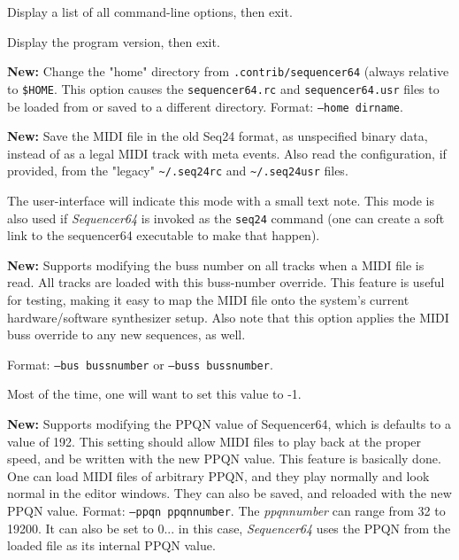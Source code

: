       Display a list of all command-line options, then exit.

      Display the program version, then exit.

      \textbf{New:}
      Change the "home" directory from \texttt{.contrib/sequencer64}
      (always relative to \texttt{\$HOME}.
      This option causes the \texttt{sequencer64.rc}
      and \texttt{sequencer64.usr} files to be loaded from or
      saved to a different directory.
      Format: \texttt{--home dirname}.

      \textbf{New:}
      Save the MIDI file in the old Seq24 format, as unspecified
      binary data, instead of as a legal MIDI track with meta events.
      Also read the configuration, if provided, from the "legacy"
      \texttt{\textasciitilde/.seq24rc} and
      \texttt{\textasciitilde/.seq24usr} files.


      The user-interface will indicate this mode with a small text
      note.
      This mode is also used if \textsl{Sequencer64} is invoked as the
      \texttt{seq24} command (one can create a soft link to the sequencer64
      executable to make that happen).

      \textbf{New:}
      Supports modifying the buss number on all tracks when a MIDI file is
      read.  All tracks are loaded with this buss-number override.  This
      feature is useful for testing, making it easy to map the MIDI file onto
      the system's current hardware/software synthesizer setup.
      Also note that this option applies the MIDI buss override to any new
      sequences, as well.

      Format: \texttt{--bus bussnumber} or
      \texttt{--buss bussnumber}.

      Most of the time, one will want to set this value to -1.

      \textbf{New:}
      Supports modifying the PPQN value of Sequencer64, which is
      defaults to a value of 192.  This setting should allow MIDI files to
      play back at the proper speed, and be written with the new PPQN value.
      This feature is basically done.
      One can load MIDI files of arbitrary PPQN, and they
      play normally and look normal in the editor windows.  They can also be
      saved, and reloaded with the new PPQN value. 
      Format: \texttt{--ppqn ppqnnumber}.
      The \textsl{ppqnnumber} can range from 32 to 19200.
      It can also be set to 0... in this case, \textsl{Sequencer64}
      uses the PPQN from the loaded file as its internal PPQN value.

